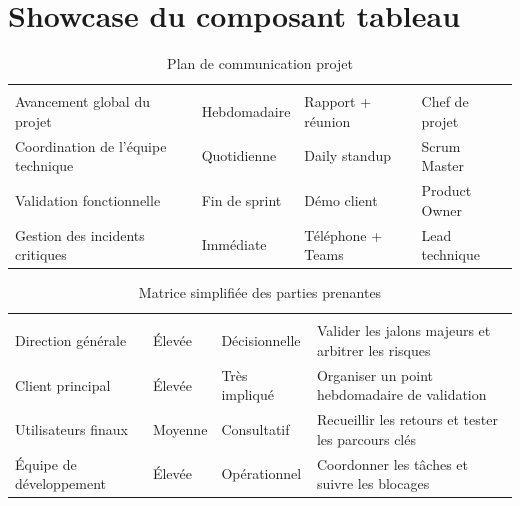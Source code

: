 \documentclass[11pt, a4paper]{article}
\begin{document}
\section*{Showcase du composant tableau}

\begin{table}[H]
\centering
\CERTableStyle
\caption{Plan de communication projet}
\label{tab:sample-communication}
\begin{tabularx}{\textwidth}{Y C{2.5cm} C{2.8cm} Y}
\toprule
{} &  &  &  \\
Avancement global du projet & Hebdomadaire & Rapport + r\'eunion & Chef de projet \\
Coordination de l'\'equipe technique & Quotidienne & Daily standup & Scrum Master \\
Validation fonctionnelle & Fin de sprint & D\'emo client & Product Owner \\
Gestion des incidents critiques & Imm\'ediate & T\'el\'ephone + Teams & Lead technique \\
\bottomrule
\end{tabularx}
\end{table}

\begin{table}[H]
\centering
\CERTableStyle
\caption{Matrice simplifi\'ee des parties prenantes}
\label{tab:sample-stakeholders}
\begin{tabularx}{\textwidth}{Y C{2.4cm} C{2.8cm} Y}
\toprule
{} &  &  &  \\
Direction g\'en\'erale & \'Elev\'ee & D\'ecisionnelle & Valider les jalons majeurs et arbitrer les risques \\
Client principal & \'Elev\'ee & Tr\`es impliqu\'e & Organiser un point hebdomadaire de validation \\
Utilisateurs finaux & Moyenne & Consultatif & Recueillir les retours et tester les parcours cl\'es \\
\'Equipe de d\'eveloppement & \'Elev\'ee & Op\'erationnel & Coordonner les t\^aches et suivre les blocages \\
\bottomrule
\end{tabularx}
\end{table}
\end{document}
